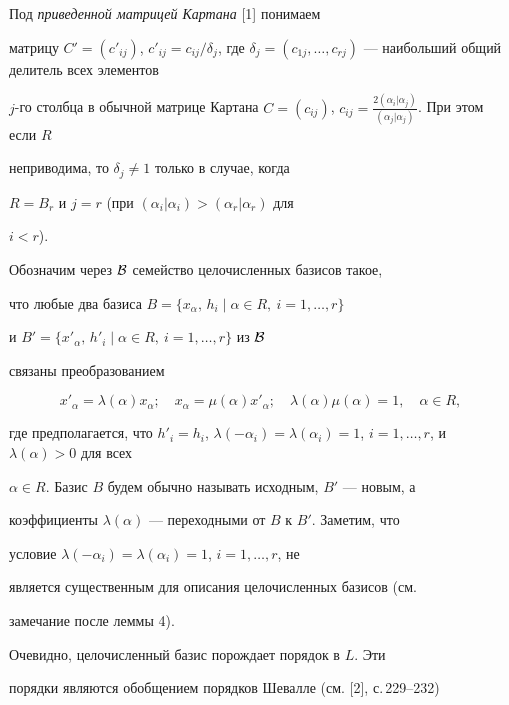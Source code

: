 Под {\it приведенной матрицей Картана} [1] понимаем


матрицу $C'=(c'_{ij})$, $c'_{ij}=c_{ij}/\delta_j$, где $\delta_j=


(c_{1j},\dotsc,c_{rj})$ --- наибольший общий делитель всех элементов


$j$-го столбца в обычной матрице Картана $C=(c_{ij})$, $c_{ij}=


\frac{2(\alpha_i|\alpha_j)} {(\alpha_j|\alpha_j)}$. При этом если $R$


неприводима, то $\delta_j\ne 1$ только в случае, когда


$R=B_r$ и $j=r$ (при $(\alpha_i|\alpha_i)>(\alpha_r|\alpha_r)$ для


$i<r$).





Обозначим через $\cal B$ семейство целочисленных базисов такое,


что любые два базиса $B=\{x_\alpha,\,h_i\mid \alpha\in R,\ i=1,\dotsc,r\}$


и $B'=\{x'_\alpha,\,h'_i\mid \alpha\in R,\ i=1,\dotsc,r\}$ из $\cal B$


связаны преобразованием


$$


x'_\alpha=\lambda(\alpha)x_\alpha; \quad


x_\alpha=\mu(\alpha)x'_\alpha; \quad


\lambda(\alpha)\mu(\alpha)=1, \quad \alpha\in R,


$$


где предполагается, что $h'_i=h_i$, $\lambda(-\alpha_i)=


\lambda(\alpha_i)=1$, $i=1,\dotsc,r$, и $\lambda(\alpha)>0$ для всех


$\alpha\in R$. Базис $B$ будем обычно называть исходным, $B'$ --- новым, а


коэффициенты $\lambda(\alpha)$ --- переходными от $B$ к $B'$. Заметим, что


условие $\lambda(-\alpha_i)=\lambda(\alpha_i)=1$, $i=1,\dotsc,r$, не


является существенным для описания целочисленных базисов (см.


замечание после леммы 4).





Очевидно, целочисленный базис порождает порядок в $L$. Эти


порядки являются обобщением порядков Шевалле (см. [2], с.\,229--232)



